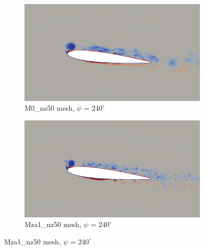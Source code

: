 

\begin{figure}[H]
	\centering
	\begin{center}
		\begin{subfigure}[b]{0.6\textwidth}
			\centering
			\includegraphics[width=1\textwidth]{figures/zonal_adapt_results/vorticity_plots_Re200k/M0/phase_240.png}
			\caption{M0\_nz50 mesh, $\psi$ = $240^\circ$}
			\label{fig:M0_Re200k_sp_psi240}
		\end{subfigure}
	\end{center}
	\begin{subfigure}[b]{0.6\textwidth}
		\centering
		\includegraphics[width=1\textwidth]{figures/zonal_adapt_results/vorticity_plots_Re200k/Mza1_50/phase_240.png}
		\caption{Mza1\_nz50 mesh, $\psi$ = $240^\circ$}
		\label{fig:Mza1_50_Re200k_sp_psi240}
	\end{subfigure}

\end{figure}
